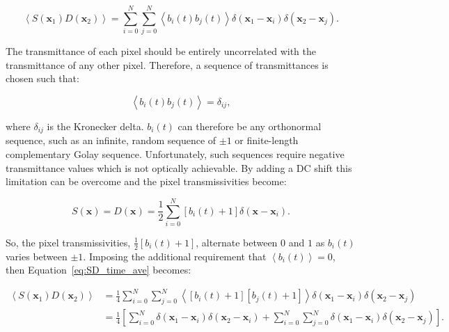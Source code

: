 \begin{equation}\label{eq:SD_time_ave}
\left\langle S\left(\textbf{x}_{1}\right) D\left(\textbf{x}_{2}\right)\right\rangle = \sum_{i=0}^{N}\sum_{j=0}^{N} \left\langle b_{i}\left(t\right) b_{j}\left(t\right)\right\rangle \delta\left(\textbf{x}_{1} - \textbf{x}_{i}\right) \delta\left(\textbf{x}_{2} - \textbf{x}_{j}\right).
\end{equation}

The transmittance of each pixel should be entirely 
uncorrelated with the transmittance of any other pixel. 
Therefore, a sequence of transmittances is chosen such that:

\begin{equation}\label{eq:pixel_uncorrelation}
\left\langle b_{i}\left(t\right) b_{j}\left(t\right)\right\rangle = \delta_{ij},
\end{equation}

where $\delta_{ij}$ is the Kronecker delta. $b_{i}\left(t\right)$ 
can therefore be any orthonormal sequence, such as an infinite, 
random sequence of $\pm1$ or finite-length complementary Golay 
sequence\cite{golay1949multi}. Unfortunately, such sequences 
require negative transmittance values which is not optically 
achievable. By adding a DC shift this limitation can be overcome 
and the pixel transmissivities become:

\begin{equation}\label{eq:detector_aperture_time_DC}
S\left(\textbf{x}\right) = D\left(\textbf{x}\right) = \frac{1}{2} \sum_{i=0}^{N} \left[b_{i}\left(t\right) + 1\right]\delta\left(\textbf{x} - \textbf{x}_{i}\right).
\end{equation} 

So, the pixel transmissivities, $\frac{1}{2}\left[b_{i}\left(t\right) + 
1\right]$, alternate between $0$ and $1$ as $b_{i}\left(t\right)$ 
varies between $\pm1$. Imposing the additional requirement that 
$\left\langle b_{i}\left(t\right) \right\rangle = 0$, then 
Equation~\ref{eq:SD_time_ave} becomes:

\begin{equation}\label{eq:SD_time_ave_DC}
\begin{split}
\left\langle S\left(\textbf{x}_{1}\right) D\left(\textbf{x}_{2}\right)\right\rangle &= \frac{1}{4} \sum_{i=0}^{N}\sum_{j=0}^{N} \left\langle \left[b_{i}\left(t\right) + 1\right] \left[b_{j}\left(t\right) + 1\right] \right\rangle \delta\left(\textbf{x}_{1} - \textbf{x}_{i}\right) \delta\left(\textbf{x}_{2} - \textbf{x}_{j}\right)\\
&= \frac{1}{4} \left[\sum_{i=0}^{N} \delta\left(\textbf{x}_{1} - \textbf{x}_{i}\right) \delta\left(\textbf{x}_{2} - \textbf{x}_{i}\right) + \sum_{i=0}^{N}\sum_{j=0}^{N} \delta\left(\textbf{x}_{1} - \textbf{x}_{i}\right) \delta\left(\textbf{x}_{2} - \textbf{x}_{j}\right)\right].\\
\end{split}
\end{equation}

